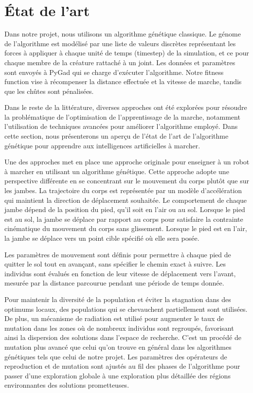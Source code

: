 \documentclass[journal, a4paper]{IEEEtran}
\begin{document}
\section{État de l'art}

Dans notre projet, nous utilisons un algorithme génétique classique. Le génome de l'algorithme est modélisé par une liste de valeurs discrètes représentant les forces à appliquer à chaque unité de temps (timestep) de la simulation, et ce pour chaque membre de la créature rattaché à un joint. Les données et paramètres sont envoyés à PyGad qui se charge d'exécuter l'algorithme. Notre fitness function vise à récompenser la distance effectuée et la vitesse de marche, tandis que les chûtes sont pénalisées.

Dans le reste de la littérature, diverses approches ont été explorées pour résoudre la problématique de l'optimisation de l'apprentissage de la marche, notamment l'utilisation de techniques avancées pour améliorer l'algorithme employé. Dans cette section, nous présenterons un aperçu de l'état de l'art de l'algorithme génétique pour apprendre aux intelligences artificielles à marcher.


Une des approches \cite{1-evol} met en place une approche originale pour enseigner à un robot à marcher en utilisant un algorithme génétique. Cette approche adopte une perspective différente en se concentrant sur le mouvement du corps plutôt que sur les jambes. La trajectoire du corps est représentée par un modèle d'accélération qui maintient la direction de déplacement souhaitée. Le comportement de chaque jambe dépend de la position du pied, qu'il soit en l'air ou au sol. Lorsque le pied est au sol, la jambe se déplace par rapport au corps pour satisfaire la contrainte cinématique du mouvement du corps sans glissement. Lorsque le pied est en l'air, la jambe se déplace vers un point cible spécifié où elle sera posée.

Les paramètres de mouvement sont définis pour permettre à chaque pied de quitter le sol tout en avançant, sans spécifier le chemin exact à suivre. Les individus sont évalués en fonction de leur vitesse de déplacement vers l'avant, mesurée par la distance parcourue pendant une période de temps donnée.

Pour maintenir la diversité de la population et éviter la stagnation dans des optimums locaux, des populations qui se chevauchent partiellement sont utilisées. De plus, un mécanisme de radiation est utilisé pour augmenter le taux de mutation dans les zones où de nombreux individus sont regroupés, favorisant ainsi la dispersion des solutions dans l'espace de recherche. C'est un procédé de mutation plus avancé que celui qu'on trouve en général dans les algorithmes génétiques tels que celui de notre projet. Les paramètres des opérateurs de reproduction et de mutation sont ajustés au fil des phases de l'algorithme pour passer d'une exploration globale à une exploration plus détaillée des régions environnantes des solutions prometteuses.
\end{document}
